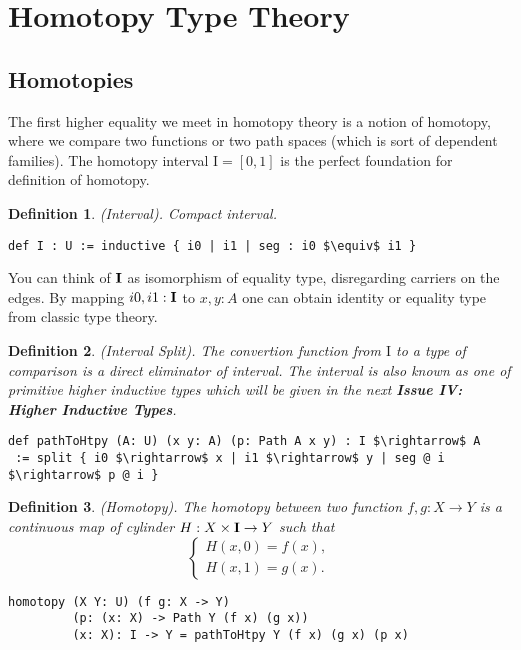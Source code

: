 \documentclass{article}
\newtheorem{definition}{Definition}
\begin{document}
\newpage
\section{Homotopy Type Theory}
\subsection{Homotopies}
The first higher equality we meet in homotopy theory is a notion of homotopy,
where we compare two functions or two path spaces (which is sort of dependent families).
The homotopy interval $\mathrm{I}=[0,1]$ is the perfect foundation for definition of homotopy.

\begin{definition} (Interval). Compact interval.
\begin{lstlisting}[mathescape=true]
def I : U := inductive { i0 | i1 | seg : i0 $\equiv$ i1 }
\end{lstlisting}
\end{definition}

You can think of ${\bf I}$ as isomorphism of equality type,
disregarding carriers on the edges. By mapping $i0,i1:{\bf I}$ to $x,y:A$ one can
obtain identity or equality type from classic type theory.

\begin{definition} (Interval Split).
The convertion function from $\mathrm{I}$ to a type of comparison
is a direct eliminator of interval. The interval is also known as one of
primitive higher inductive types which will be given in the next
{\bf Issue IV: Higher Inductive Types}.
\begin{lstlisting}[mathescape=true]
def pathToHtpy (A: U) (x y: A) (p: Path A x y) : I $\rightarrow$ A
 := split { i0 $\rightarrow$ x | i1 $\rightarrow$ y | seg @ i $\rightarrow$ p @ i }
\end{lstlisting}
\end{definition}

\begin{definition} (Homotopy). The homotopy between two function $f,g: X \rightarrow Y$
is a continuous map of cylinder $H : X \times {\bf I} \rightarrow Y$ such that
$$
\begin{cases}
H(x,0)=f(x), \\
H(x,1)=g(x).
\end{cases}
$$
\begin{lstlisting}
homotopy (X Y: U) (f g: X -> Y)
         (p: (x: X) -> Path Y (f x) (g x))
         (x: X): I -> Y = pathToHtpy Y (f x) (g x) (p x)
\end{lstlisting}
\end{definition}
\end{document}
